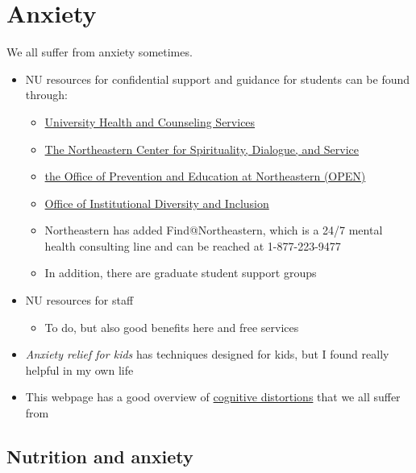 \documentclass[
  letterpaper,
  DIV=11,
  numbers=noendperiod]{scrreprt}
\providecommand{\tightlist}{%
  \setlength{\itemsep}{0pt}\setlength{\parskip}{0pt}}\usepackage{longtable,booktabs,array}
\begin{document}
\hypertarget{anxiety}{%
\section*{\texorpdfstring{\textbf{Anxiety}}{Anxiety}}\label{anxiety}}


We all suffer from anxiety sometimes.

\begin{itemize}
\item
  NU resources for confidential support and guidance for students can be
  found through:

  \begin{itemize}
  \item
    \href{https://www.northeastern.edu/uhcs/}{University Health and
    Counseling Services}
  \item
    \href{https://www.northeastern.edu/spirituallife/}{The Northeastern
    Center for Spirituality, Dialogue, and Service}
  \item
    \href{https://studentlife.northeastern.edu/open/}{the Office of
    Prevention and Education at Northeastern (OPEN)}
  \item
    \href{https://provost.northeastern.edu/oidi/}{Office of
    Institutional Diversity and Inclusion}
  \item
    Northeastern has added Find@Northeastern, which is a 24/7 mental
    health consulting line and can be reached at 1-877-223-9477
  \item
    In addition, there are graduate student support groups
  \end{itemize}
\item
  NU resources for staff

  \begin{itemize}
  \tightlist
  \item
    To do, but also good benefits here and free services
  \end{itemize}
\item
  \emph{Anxiety relief for kids} has techniques designed for kids, but I
  found really helpful in my own life
\item
  This webpage has a good overview of
  \href{https://positivepsychology.com/cognitive-distortions/}{cognitive
  distortions} that we all suffer from
\end{itemize}

\hypertarget{nutrition-and-anxiety}{%
\subsection*{\texorpdfstring{\textbf{Nutrition and
anxiety}}{Nutrition and anxiety}}\label{nutrition-and-anxiety}}
\end{document}
